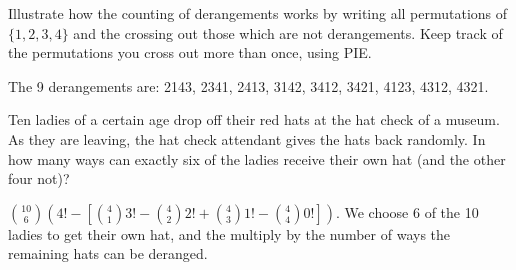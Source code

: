 \begin{questions}
\question Illustrate how the counting of derangements works by writing all permutations of $\{1,2,3,4\}$ and the crossing out those which are not derangements.  Keep track of the permutations you cross out more than once, using PIE.
	\begin{answer}
		The 9 derangements are: 2143, 2341, 2413, 3142, 3412, 3421, 4123, 4312, 4321.
	\end{answer}



\question Ten ladies of a certain age drop off their red hats at the hat check of a museum.  As they are leaving, the hat check attendant gives the hats back randomly.  In how many ways can exactly six of the ladies receive their own hat (and the other four not)?

	\begin{answer}
	${10 \choose 6}\left(4! - \left[{4 \choose 1} 3! - {4 \choose 2}2! + {4 \choose 3}1! - {4 \choose 4}0!\right]\right)$.  We choose 6 of the 10 ladies to get their own hat, and the multiply by the number of ways the remaining hats can be deranged.
	\end{answer}





\end{questions}
